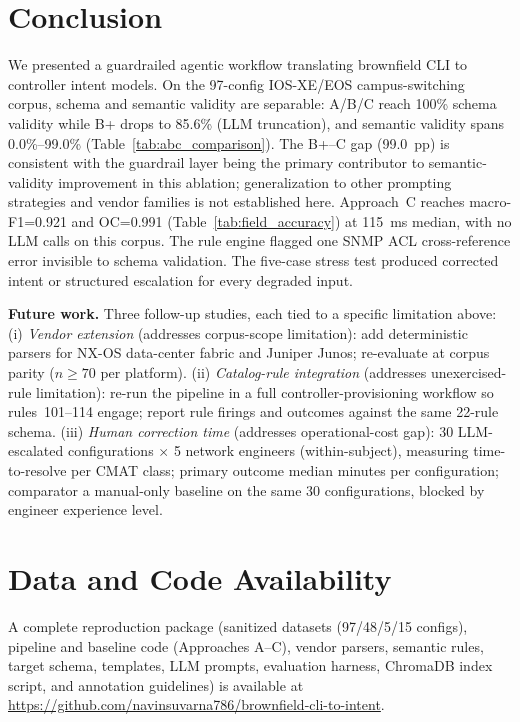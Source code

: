 \documentclass[conference]{IEEEtran}
\begin{document}
\section{Conclusion}

We presented a guardrailed agentic workflow translating brownfield CLI to controller intent models. On the 97-config IOS-XE/EOS campus-switching corpus, schema and semantic validity are separable: A/B/C reach 100\% schema validity while B+ drops to 85.6\% (LLM truncation), and semantic validity spans 0.0\%--99.0\% (Table~\ref{tab:abc_comparison}). The B+--C gap (99.0~pp) is consistent with the guardrail layer being the primary contributor to semantic-validity improvement in this ablation; generalization to other prompting strategies and vendor families is not established here. Approach~C reaches macro-F1=0.921 and OC=0.991 (Table~\ref{tab:field_accuracy}) at 115~ms median, with no LLM calls on this corpus. The rule engine flagged one SNMP ACL cross-reference error invisible to schema validation. The five-case stress test produced corrected intent or structured escalation for every degraded input.

\textbf{Future work.} Three follow-up studies, each tied to a specific limitation above:
(i) \emph{Vendor extension} (addresses corpus-scope limitation): add deterministic parsers for NX-OS data-center fabric and Juniper Junos; re-evaluate at corpus parity ($n \geq 70$ per platform).
(ii) \emph{Catalog-rule integration} (addresses unexercised-rule limitation): re-run the pipeline in a full controller-provisioning workflow so rules~101--114 engage; report rule firings and outcomes against the same 22-rule schema.
(iii) \emph{Human correction time} (addresses operational-cost gap): 30 LLM-escalated configurations $\times$ 5 network engineers (within-subject), measuring time-to-resolve per CMAT class; primary outcome median minutes per configuration; comparator a manual-only baseline on the same 30 configurations, blocked by engineer experience level.

\section*{Data and Code Availability}

A complete reproduction package (sanitized datasets (97/48/5/15 configs), pipeline and baseline code (Approaches A–C), vendor parsers, semantic rules, target schema, templates, LLM prompts, evaluation harness, ChromaDB index script, and annotation guidelines) is available at \url{https://github.com/navinsuvarna786/brownfield-cli-to-intent}.



\end{document}
